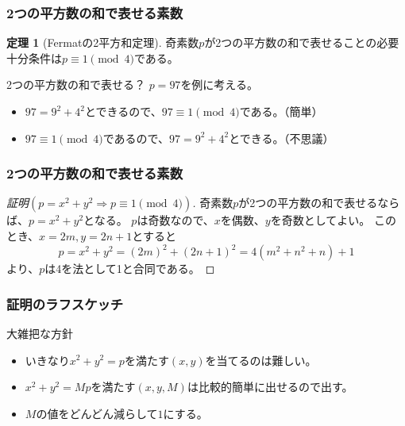 \documentclass[dvipdfmx,11pt,notheorems]{beamer}
\theoremstyle{definition}
\newtheorem{theorem}{定理}
\begin{document}
\begin{frame}\frametitle{2つの平方数の和で表せる素数}

\begin{theorem}[Fermatの2平方和定理]
奇素数$p$が2つの平方数の和で表せることの必要十分条件は$p \equiv 1 \pmod{4}$である。
\end{theorem}

\begin{exampleblock}{2つの平方数の和で表せる？}
$p=97$を例に考える。
\begin{itemize}
\item $97 = 9^{2} + 4^{2}$とできるので、$97 \equiv 1 \pmod{4}$である。（簡単）
\item $97 \equiv 1 \pmod{4}$であるので、$97 = 9^{2} + 4^{2}$とできる。（不思議）
\end{itemize}
\end{exampleblock}

\end{frame}

\begin{frame}\frametitle{2つの平方数の和で表せる素数}

\begin{proof}[証明$(p = x^{2}+y^{2}\Rightarrow p \equiv 1 \pmod{4})$]
奇素数$p$が2つの平方数の和で表せるならば、$p=x^{2}+y^{2}$となる。
$p$は奇数なので、$x$を偶数、$y$を奇数としてよい。
このとき、$x=2m, y=2n+1$とすると
\begin{equation*}
p = x^{2}+y^{2} = (2m)^{2} + (2n + 1)^{2} = 4(m^{2} + n^{2} + n) + 1
\end{equation*}
より、$p$は4を法として1と合同である。

\end{proof}

\end{frame}

\begin{frame}\frametitle{証明のラフスケッチ}

\begin{block}{大雑把な方針}
\begin{itemize}
\item いきなり$x^{2} + y^{2}=p$を満たす$(x, y)$を当てるのは難しい。
\item $x^{2} + y^{2}=Mp$を満たす$(x, y, M)$は比較的簡単に出せるので出す。
\item $M$の値をどんどん減らして$1$にする。
\end{itemize}
\end{block}

\end{frame}
\end{document}

